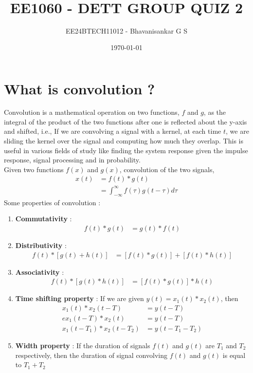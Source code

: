 \documentclass[12pt]{article}
\title{\textbf{EE1060 - DETT GROUP QUIZ 2}}
\author{EE24BTECH11012 - Bhavanisankar G S}
\date{\today}
\begin{document}
\maketitle
\thispagestyle{empty} %

\newpage
\tableofcontents
\newpage

\section{\textbf{What is convolution ?}}

Convolution is a mathematical operation on two functions, $f$ and $g$, as the integral of the product of the two functions after one is reflected about the y-axis and shifted, i.e., If we are convolving a signal with a kernel, at each time $t$, we are sliding the kernel over the signal and computing how much they overlap. This is useful in various fields of study like finding the system response given the impulse response, signal processing and in probability.\\
Given two functions $f(x)$ and $g(x)$, convolution of the two signals, \\
\begin{align}
	x(t) &= f(t) * g(t) \\
	     &= \int_{-\infty}^{\infty} f(\tau) g(t - \tau) d \tau \label{eq:conv}
\end{align}
Some properties of convolution : \\
\begin{enumerate}
\item \textbf{Commutativity} : 
\begin{align*}
f(t) * g(t) &= g(t) * f(t)
\end{align*}
\item \textbf{Distributivity} :
\begin{align*}
f(t) * [g(t) + h(t)] &= [f(t) * g(t)] + [f(t) * h(t)] 
\end{align*}
\item \textbf{Associativity} :
\begin{align*}
f(t) * [g(t) * h(t)] &= [f(t) * g(t)] * h(t)
\end{align*}
\item \textbf{Time shifting property} :
If we are given $y(t) = x_1 (t) * x_2 (t)$, then
\begin{align*}
	x_1(t) * x_2(t - T) &= y(t - T) \\
ex_1(t - T) * x_2(t) &= y(t - T) \\
	x_1(t - T_1) * x_2(t - T_2) &= y(t - T_1 - T_2)
\end{align*}
\item \textbf{Width property} :
If the duration of signals $f(t)$ and $g(t)$ are $T_1$ and $T_2$ respectively, then the duration of signal convolving $f(t)$ and $g(t)$ is equal to $T_1 + T_2$
\end{enumerate}
\end{document}
